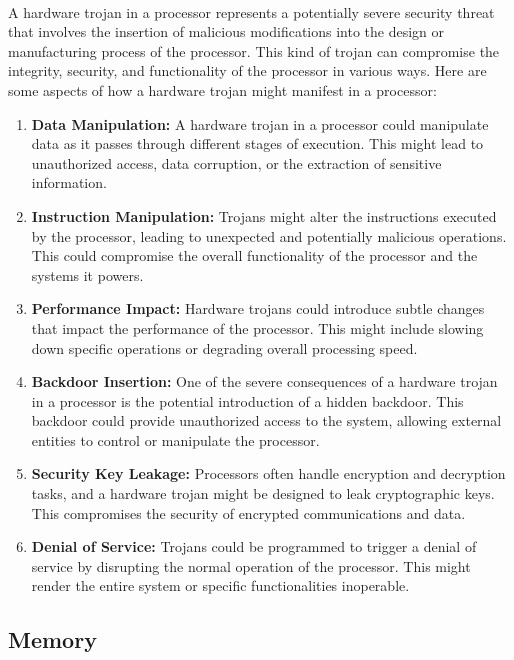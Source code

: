\paragraph*{}
A hardware trojan in a processor represents a potentially severe security threat that involves the insertion of malicious modifications into the design or manufacturing process of the processor. This kind of trojan can compromise the integrity, security, and functionality of the processor in various ways. Here are some aspects of how a hardware trojan might manifest in a processor:
\begin{enumerate}
	\item \textbf{Data Manipulation:} A hardware trojan in a processor could manipulate data as it passes through different stages of execution. This might lead to unauthorized access, data corruption, or the extraction of sensitive information.
	\item \textbf{Instruction Manipulation:} Trojans might alter the instructions executed by the processor, leading to unexpected and potentially malicious operations. This could compromise the overall functionality of the processor and the systems it powers.
	\item \textbf{Performance Impact:} Hardware trojans could introduce subtle changes that impact the performance of the processor. This might include slowing down specific operations or degrading overall processing speed.
	\item \textbf{Backdoor Insertion:} One of the severe consequences of a hardware trojan in a processor is the potential introduction of a hidden backdoor. This backdoor could provide unauthorized access to the system, allowing external entities to control or manipulate the processor.
	\item \textbf{Security Key Leakage:} Processors often handle encryption and decryption tasks, and a hardware trojan might be designed to leak cryptographic keys. This compromises the security of encrypted communications and data.
	\item \textbf{Denial of Service:} Trojans could be programmed to trigger a denial of service by disrupting the normal operation of the processor. This might render the entire system or specific functionalities inoperable.
\end{enumerate}
\subsection{Memory}
